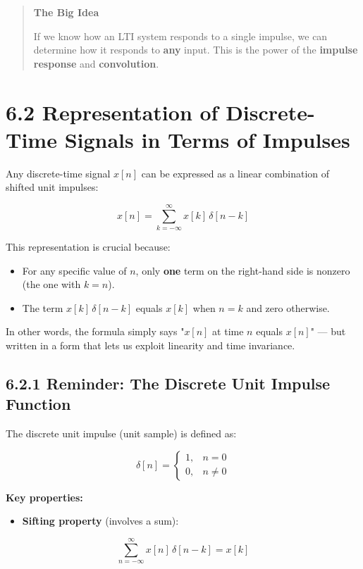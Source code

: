 \documentclass[11pt]{article}
\begin{document}
\begin{quote}
\textbf{The Big Idea}

If we know how an LTI system responds to a single impulse, we can determine how it responds to \textbf{any} input. This is the power of the \textbf{impulse response} and \textbf{convolution}.
\end{quote}

\section*{6.2 Representation of Discrete-Time Signals in Terms of Impulses}

Any discrete-time signal $x[n]$ can be expressed as a linear combination of shifted unit impulses:

\[\boxed{\,x[n] = \sum_{k=-\infty}^{\infty} x[k]\,\delta[n-k]\,}\]

This representation is crucial because:

\begin{itemize}
  \item For any specific value of $n$, only \textbf{one} term on the right-hand side is nonzero (the one with $k=n$).
  \item The term $x[k]\,\delta[n-k]$ equals $x[k]$ when $n = k$ and zero otherwise.
\end{itemize}

In other words, the formula simply says "$x[n]$ at time $n$ equals $x[n]$" — but written in a form that lets us exploit linearity and time invariance.

\subsection*{6.2.1 Reminder: The Discrete Unit Impulse Function}

The discrete unit impulse (unit sample) is defined as:

\[\delta[n] = \begin{cases} 1, & n = 0 \\ 0, & n \neq 0 \end{cases}\]

\textbf{Key properties:}

\begin{itemize}
  \item \textbf{Sifting property} (involves a sum):
\end{itemize}

\[\sum_{n=-\infty}^{\infty} x[n]\,\delta[n-k] = x[k]\]
\end{document}
